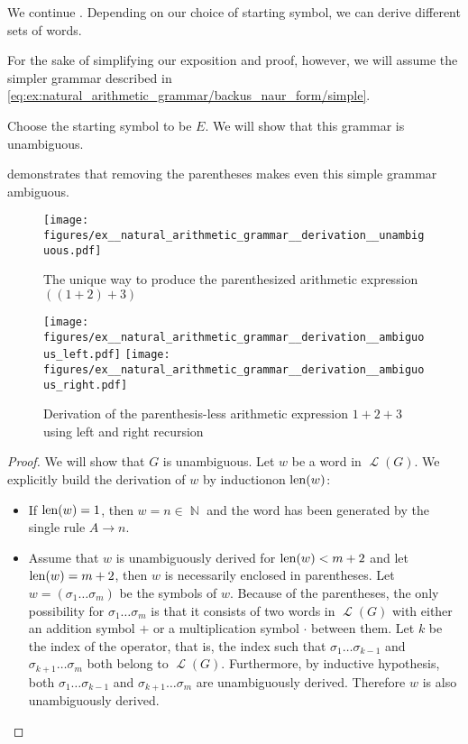 \begin{example}\label{ex:natural_arithmetic_grammar/derivation}
  We continue . Depending on our choice of starting symbol, we can derive different sets of words.

  For the sake of simplifying our exposition and proof, however, we will assume the simpler grammar described in \eqref{eq:ex:natural_arithmetic_grammar/backus_naur_form/simple}.

  Choose the starting symbol to be \( E \). We will show that this grammar is unambiguous.

   demonstrates that removing the parentheses makes even this simple grammar ambiguous.

  \begin{figure}
    \centering
    \texttt{[image: figures/ex\_\_natural\_arithmetic\_grammar\_\_derivation\_\_unambiguous.pdf]}
    \caption{The unique way to produce the parenthesized arithmetic expression \( ((1 + 2) + 3) \)}\label{ex:natural_arithmetic_grammar/derivation/unambiguous}
  \end{figure}

  \begin{figure}
    \texttt{[image: figures/ex\_\_natural\_arithmetic\_grammar\_\_derivation\_\_ambiguous\_left.pdf]}
    \hfill
    \texttt{[image: figures/ex\_\_natural\_arithmetic\_grammar\_\_derivation\_\_ambiguous\_right.pdf]}
    \caption{Derivation of the parenthesis-less arithmetic expression \( 1 + 2 + 3 \) using left and right recursion}\label{ex:natural_arithmetic_grammar/derivation/ambiguous}
  \end{figure}
\end{example}
\begin{proof}
  We will show that \( G \) is unambiguous. Let \( w \) be a word in \( \mscrL(G) \). We explicitly build the derivation of \( w \) by induction\IND on \( \operatorname{len}(w) \):
  \begin{itemize}
    \item If \( \operatorname{len}(w) = 1 \), then \( w = n \in \BbbN \) and the word has been generated by the single rule \( A \to n \).

    \item Assume that \( w \) is unambiguously derived for \( \operatorname{len}(w) < m + 2 \) and let \( \operatorname{len}(w) = m + 2 \), then \( w \) is necessarily enclosed in parentheses. Let \( w = ( \sigma_1 \ldots \sigma_m ) \) be the symbols of \( w \). Because of the parentheses, the only possibility for \( \sigma_1 \ldots \sigma_m \) is that it consists of two words in \( \mscrL(G) \) with either an addition symbol \( + \) or a multiplication symbol \( \cdot \) between them. Let \( k \) be the index of the operator, that is, the index such that \( \sigma_1 \ldots \sigma_{k-1} \) and \( \sigma_{k+1} \ldots \sigma_m \) both belong to \( \mscrL(G) \). Furthermore, by inductive hypothesis, both \( \sigma_1 \ldots \sigma_{k-1} \) and \( \sigma_{k+1} \ldots \sigma_m \) are unambiguously derived. Therefore \( w \) is also unambiguously derived.
  \end{itemize}
\end{proof}
